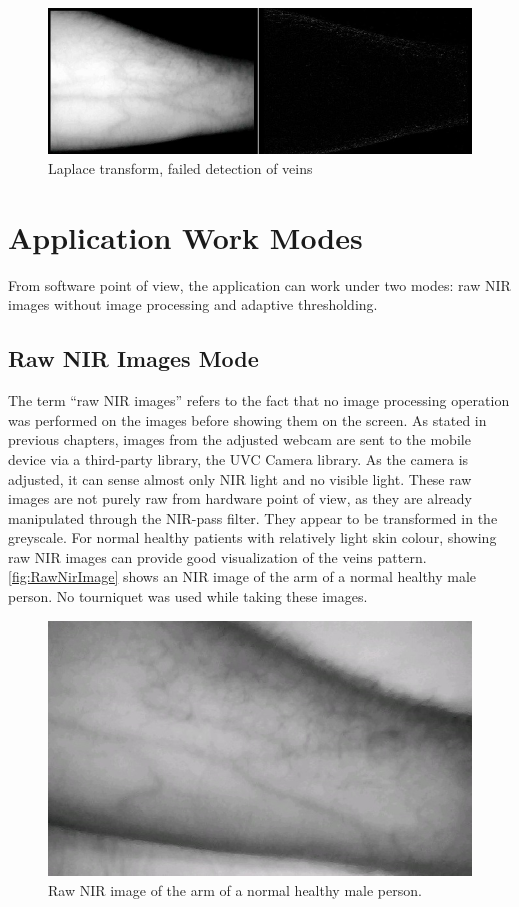 \begin{figure}[H]
\centering
\includegraphics[scale=0.7]{figures/compare9.JPG}
\caption[Laplace transform, failed detection of veins]{Laplace transform, failed detection of veins}\label{fig:Compare9}
\end{figure}


\section{Application Work Modes}
From software point of view, the application can work under two modes: raw NIR images without image processing and adaptive thresholding.

\subsection{Raw NIR Images Mode}

The term “raw NIR images” refers to the fact that no image processing operation was performed on the images before showing them on the screen. As stated in previous chapters, images from the adjusted webcam are sent to the mobile device via a third-party library, the UVC Camera library. As the camera is adjusted, it can sense almost only NIR light and no visible light. These raw images are not purely raw from hardware point of view, as they are already manipulated through the NIR-pass filter. They appear to be transformed in the greyscale. For normal healthy patients with relatively light skin colour, showing raw NIR images can provide good visualization of the veins pattern. \autoref{fig:RawNirImage} shows an NIR image of the arm of a normal healthy male person. No tourniquet was used while taking these images.


\begin{figure}[H]
\centering
\includegraphics[scale=0.7]{figures/nir.JPG}
\caption[Raw NIR Image of an Arm with Good Vein Contrast]{Raw NIR image of the arm of a normal healthy male person.}\label{fig:RawNirImage}
\end{figure}

